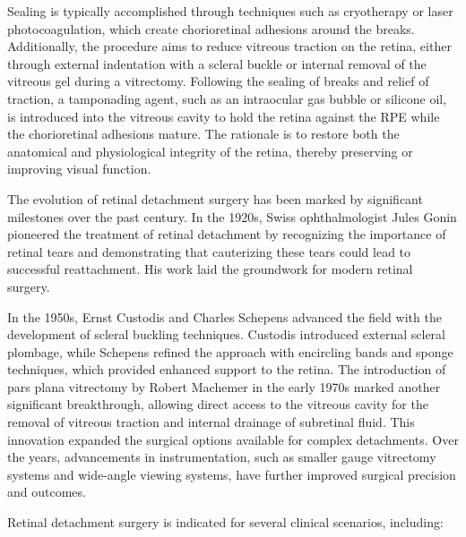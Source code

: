 Sealing is typically accomplished through techniques such as cryotherapy or laser photocoagulation, which create chorioretinal adhesions around the breaks. Additionally, the procedure aims to reduce vitreous traction on the retina, either through external indentation with a scleral buckle or internal removal of the vitreous gel during a vitrectomy. Following the sealing of breaks and relief of traction, a tamponading agent, such as an intraocular gas bubble or silicone oil, is introduced into the vitreous cavity to hold the retina against the RPE while the chorioretinal adhesions mature. The rationale is to restore both the anatomical and physiological integrity of the retina, thereby preserving or improving visual function.

The evolution of retinal detachment surgery has been marked by significant milestones over the past century. In the 1920s, Swiss ophthalmologist Jules Gonin pioneered the treatment of retinal detachment by recognizing the importance of retinal tears and demonstrating that cauterizing these tears could lead to successful reattachment. His work laid the groundwork for modern retinal surgery.

In the 1950s, Ernst Custodis and Charles Schepens advanced the field with the development of scleral buckling techniques. Custodis introduced external scleral plombage, while Schepens refined the approach with encircling bands and sponge techniques, which provided enhanced support to the retina. The introduction of pars plana vitrectomy by Robert Machemer in the early 1970s marked another significant breakthrough, allowing direct access to the vitreous cavity for the removal of vitreous traction and internal drainage of subretinal fluid. This innovation expanded the surgical options available for complex detachments. Over the years, advancements in instrumentation, such as smaller gauge vitrectomy systems and wide-angle viewing systems, have further improved surgical precision and outcomes.

Retinal detachment surgery is indicated for several clinical scenarios, including:


